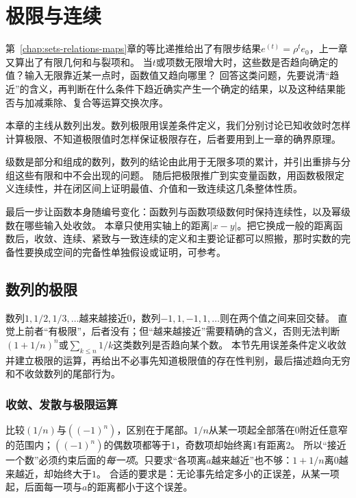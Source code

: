 \chapter{极限与连续}
\label{chap:limits-continuity}
\label{chap:function-limits}
\label{chap:mathematical-analysis}

第~\ref{chap:sets-relations-maps}章的等比递推给出了有限步结果$e^{(t)}=\rho^te_0$，上一章又算出了有限几何和与裂项和。
当$t$或项数无限增大时，这些数是否趋向确定的值？输入无限靠近某一点时，函数值又趋向哪里？
回答这类问题，先要说清“趋近”的含义，再判断在什么条件下趋近确实产生一个确定的结果，以及这种结果能否与加减乘除、复合等运算交换次序。

本章的主线从数列出发。数列极限用误差条件定义，我们分别讨论已知收敛时怎样计算极限、不知道极限值时怎样保证极限存在，后者要用到上一章的确界原理。

级数是部分和组成的数列，数列的结论由此用于无限多项的累计，并引出重排与分组这些有限和中不会出现的问题。
随后把极限推广到实变量函数，用函数极限定义连续性，并在闭区间上证明最值、介值和一致连续这几条整体性质。

最后一步让函数本身随编号变化：函数列与函数项级数何时保持连续性，以及幂级数在哪些输入处收敛。
本章只使用实轴上的距离$|x-y|$。把它换成一般的距离函数后，收敛、连续、紧致与一致连续的定义和主要论证都可以照搬，那时实数的完备性要换成空间的完备性单独假设或证明，可参考。

\section{数列的极限}
\label{sec:ru-sequence-limits}
\label{sec:analysis-continuous-limits}
\label{sec:analysis-sequences-series-errors}

数列$1,1/2,1/3,\ldots$越来越接近$0$，数列$-1,1,-1,1,\ldots$则在两个值之间来回交替。
直觉上前者“有极限”，后者没有；但“越来越接近”需要精确的含义，否则无法判断$(1+1/n)^n$或$\sum_{k\leq n}1/k$这类数列是否趋向某个数。
本节先用误差条件定义收敛并建立极限的运算，再给出不必事先知道极限值的存在性判别，最后描述趋向无穷和不收敛数列的尾部行为。

\subsection{收敛、发散与极限运算}
\label{sec:ru-convergence-limit-laws}

比较$(1/n)$与$((-1)^n)$，区别在于尾部。$1/n$从某一项起全部落在$0$附近任意窄的范围内；$((-1)^n)$的偶数项都等于$1$，奇数项却始终离$1$有距离$2$。
所以“接近一个数”必须约束后面的\emph{每一项}。只要求“各项离$a$越来越近”也不够：$1+1/n$离$0$越来越近，却始终大于$1$。
合适的要求是：无论事先给定多小的正误差，从某一项起，后面每一项与$a$的距离都小于这个误差。

